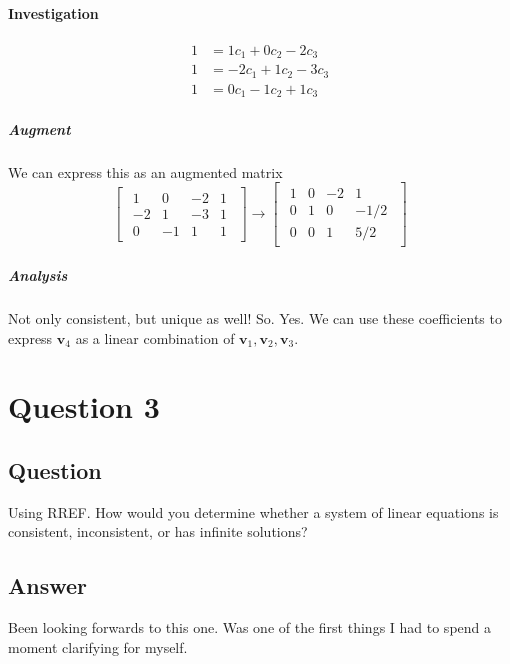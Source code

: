 \documentclass{article}
\begin{document}
        \paragraph{Investigation}
            \begin{align*}
                1 &= 1c_1 + 0c_2 -2c_3\\
                1 &= -2c_1 + 1c_2 -3c_3\\
                1 &= 0c_1 -1c_2 + 1c_3 
            \end{align*}
            \subparagraph{Augment}
                We can express this as an augmented matrix
                \[
                \begin{bmatrix}
                \begin{array}{ccc|c}
                    1 &  0 &  -2 & 1 \\
                    -2 &  1 &  -3 & 1 \\
                    0 & -1 &   1 & 1
                \end{array}
                \end{bmatrix}
                \rightarrow
                \begin{bmatrix}
                \begin{array}{ccc|c}
                    1 &  0 &  -2 & 1 \\
                    0 &  1 &  0 & -1/2 \\
                    0 &  0 &  1 & 5/2
                \end{array}
                \end{bmatrix}
                \]
            \subparagraph{Analysis}
                Not only consistent, but unique as well!
                So. Yes. We can use these coefficients
                to express $\mathbf{v}_4$ as a linear combination
                of $\mathbf{v}_1, \mathbf{v}_2, \mathbf{v}_3$.
    \section{Question 3}
        \subsection{Question}
            Using RREF. How would you determine whether a system of linear equations
            is consistent, inconsistent, or has infinite solutions?
        \subsection{Answer}
            Been looking forwards to this one. Was one of the first things I had to spend
            a moment clarifying for myself.
\end{document}
